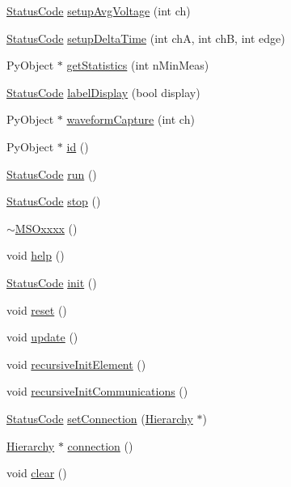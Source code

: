 \begin{DoxyCompactItemize}
\hyperlink{classStatusCode}{StatusCode} \hyperlink{classMSOxxxx_af1524bb099b5e559931704d13a1f1126}{setupAvgVoltage} (int ch)
\item 
\hyperlink{classStatusCode}{StatusCode} \hyperlink{classMSOxxxx_abbbebb3e4649c866bcdd853627f12b5d}{setupDeltaTime} (int chA, int chB, int edge)
\item 
PyObject $\ast$ \hyperlink{classMSOxxxx_a38f15b6ad8bc3cdc1836d784b3e96c59}{getStatistics} (int nMinMeas)
\item 
\hyperlink{classStatusCode}{StatusCode} \hyperlink{classMSOxxxx_ade4192f09f150be8b9c7c081ce1a1870}{labelDisplay} (bool display)
\item 
PyObject $\ast$ \hyperlink{classMSOxxxx_aed78c680bcec9e14a88eedf7b291518c}{waveformCapture} (int ch)
\item 
PyObject $\ast$ \hyperlink{classMSOxxxx_a0f14b23d31d8e7647184e99a89600cc3}{id} ()
\item 
\hyperlink{classStatusCode}{StatusCode} \hyperlink{classMSOxxxx_a96ca34744e5a6b611aaf9ae7910f00cd}{run} ()
\item 
\hyperlink{classStatusCode}{StatusCode} \hyperlink{classMSOxxxx_a4ec991c3850a652fbe9a1709cab7001b}{stop} ()
\item 
\hyperlink{classMSOxxxx_a567c156d78fbeab9d61bf8ec9acac851}{$\sim$MSOxxxx} ()
\item 
void \hyperlink{classMSOxxxx_a8c22ff23297ada963eaf12b6e0b62017}{help} ()
\item 
\hyperlink{classStatusCode}{StatusCode} \hyperlink{classMSOxxxx_ac14ed16b221798423e7c3b5e285006b5}{init} ()
\item 
void \hyperlink{classMSOxxxx_a26f03d21da556529155898dc115c301c}{reset} ()
\item 
void \hyperlink{classMSOxxxx_a09452d6e75cd9adfaec93606fbb998dc}{update} ()
\item 
void \hyperlink{classElement_a3c0abcb36f8906688bb7e32608df7086}{recursiveInitElement} ()
\item 
void \hyperlink{classElement_a82119ed37dff76508a2746a853ec35ba}{recursiveInitCommunications} ()
\item 
\hyperlink{classStatusCode}{StatusCode} \hyperlink{classElement_ab476b4b1df5954141ceb14f072433b89}{setConnection} (\hyperlink{classHierarchy}{Hierarchy} $\ast$)
\item 
\hyperlink{classHierarchy}{Hierarchy} $\ast$ \hyperlink{classElement_af57444353c1ddf9fa0109801e97debf7}{connection} ()
\item 
void \hyperlink{classHierarchy_af4d43b0765b402670eed2d62c73405af}{clear} ()

\end{DoxyCompactItemize}
